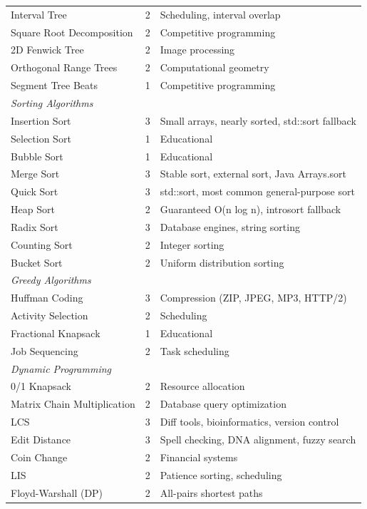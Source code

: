 \begin{center}
\begin{tabular}{lcl}
Interval Tree & 2 & Scheduling, interval overlap \\
Square Root Decomposition & 2 & Competitive programming \\
2D Fenwick Tree & 2 & Image processing \\
Orthogonal Range Trees & 2 & Computational geometry \\
Segment Tree Beats & 1 & Competitive programming \\
\midrule
\multicolumn{3}{l}{\textit{Sorting Algorithms}} \\
\midrule
Insertion Sort & 3 & Small arrays, nearly sorted, std::sort fallback \\
Selection Sort & 1 & Educational \\
Bubble Sort & 1 & Educational \\
Merge Sort & 3 & Stable sort, external sort, Java Arrays.sort \\
Quick Sort & 3 & std::sort, most common general-purpose sort \\
Heap Sort & 2 & Guaranteed O(n log n), introsort fallback \\
Radix Sort & 3 & Database engines, string sorting \\
Counting Sort & 2 & Integer sorting \\
Bucket Sort & 2 & Uniform distribution sorting \\
\midrule
\multicolumn{3}{l}{\textit{Greedy Algorithms}} \\
\midrule
Huffman Coding & 3 & Compression (ZIP, JPEG, MP3, HTTP/2) \\
Activity Selection & 2 & Scheduling \\
Fractional Knapsack & 1 & Educational \\
Job Sequencing & 2 & Task scheduling \\
\midrule
\multicolumn{3}{l}{\textit{Dynamic Programming}} \\
\midrule
0/1 Knapsack & 2 & Resource allocation \\
Matrix Chain Multiplication & 2 & Database query optimization \\
LCS & 3 & Diff tools, bioinformatics, version control \\
Edit Distance & 3 & Spell checking, DNA alignment, fuzzy search \\
Coin Change & 2 & Financial systems \\
LIS & 2 & Patience sorting, scheduling \\
Floyd-Warshall (DP) & 2 & All-pairs shortest paths \\

\end{tabular}
\end{center}
